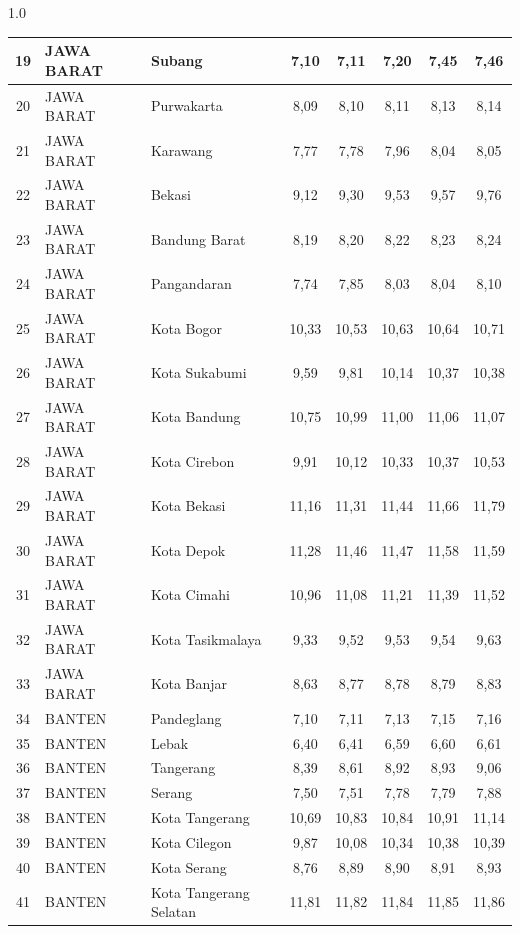 \begin{spacing}{1.0}
\begin{longtable}{|c|p{2.2cm}|p{2.8cm}|c|c|c|c|c|}
19 & JAWA BARAT & Subang & 7,10 & 7,11 & 7,20 & 7,45 & 7,46 \\ \hline
20 & JAWA BARAT & Purwakarta & 8,09 & 8,10 & 8,11 & 8,13 & 8,14 \\ \hline
21 & JAWA BARAT & Karawang & 7,77 & 7,78 & 7,96 & 8,04 & 8,05 \\ \hline
22 & JAWA BARAT & Bekasi & 9,12 & 9,30 & 9,53 & 9,57 & 9,76 \\ \hline
23 & JAWA BARAT & Bandung Barat & 8,19 & 8,20 & 8,22 & 8,23 & 8,24 \\ \hline
24 & JAWA BARAT & Pangandaran & 7,74 & 7,85 & 8,03 & 8,04 & 8,10 \\ \hline
25 & JAWA BARAT & Kota Bogor & 10,33 & 10,53 & 10,63 & 10,64 & 10,71 \\ \hline
26 & JAWA BARAT & Kota Sukabumi & 9,59 & 9,81 & 10,14 & 10,37 & 10,38 \\ \hline
27 & JAWA BARAT & Kota Bandung & 10,75 & 10,99 & 11,00 & 11,06 & 11,07 \\ \hline
28 & JAWA BARAT & Kota Cirebon & 9,91 & 10,12 & 10,33 & 10,37 & 10,53 \\ \hline
29 & JAWA BARAT & Kota Bekasi & 11,16 & 11,31 & 11,44 & 11,66 & 11,79 \\ \hline
30 & JAWA BARAT & Kota Depok & 11,28 & 11,46 & 11,47 & 11,58 & 11,59 \\ \hline
31 & JAWA BARAT & Kota Cimahi & 10,96 & 11,08 & 11,21 & 11,39 & 11,52 \\ \hline
32 & JAWA BARAT & Kota Tasikmalaya & 9,33 & 9,52 & 9,53 & 9,54 & 9,63 \\ \hline
33 & JAWA BARAT & Kota Banjar & 8,63 & 8,77 & 8,78 & 8,79 & 8,83 \\ \hline
34 & BANTEN & Pandeglang & 7,10 & 7,11 & 7,13 & 7,15 & 7,16 \\ \hline
35 & BANTEN & Lebak & 6,40 & 6,41 & 6,59 & 6,60 & 6,61 \\ \hline
36 & BANTEN & Tangerang & 8,39 & 8,61 & 8,92 & 8,93 & 9,06 \\ \hline
37 & BANTEN & Serang & 7,50 & 7,51 & 7,78 & 7,79 & 7,88 \\ \hline
38 & BANTEN & Kota Tangerang & 10,69 & 10,83 & 10,84 & 10,91 & 11,14 \\ \hline
39 & BANTEN & Kota Cilegon & 9,87 & 10,08 & 10,34 & 10,38 & 10,39 \\ \hline
40 & BANTEN & Kota Serang & 8,76 & 8,89 & 8,90 & 8,91 & 8,93 \\ \hline
41 & BANTEN & Kota Tangerang Selatan & 11,81 & 11,82 & 11,84 & 11,85 & 11,86 \\ \hline
\end{longtable}
\end{spacing}
\newpage
